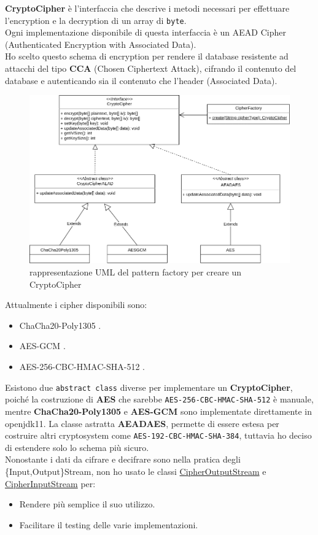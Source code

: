 \documentclass[a4paper,12pt]{report}
\begin{document}
\textbf{CryptoCipher} è l'interfaccia che descrive i metodi necessari per effettuare
l'encryption e la decryption di un array di \texttt{byte}.\\
Ogni implementazione disponibile di questa interfaccia è un
AEAD Cipher \cite{AEAD}
(Authenticated Encryption with Associated Data).\\
Ho scelto questo schema di encryption per rendere il database resistente ad 
attacchi del tipo \textbf{CCA} (Chosen Ciphertext Attack), cifrando il contenuto del
database e autenticando sia il contenuto che l'header (Associated Data).
\begin{figure}[h]
\centering{}
\includegraphics[width=\textwidth]{crypto-cipher}
\caption{rappresentazione UML del pattern factory per creare un CryptoCipher}
\end{figure}
Attualmente i cipher disponibili sono:
\begin{itemize}
  \item ChaCha20-Poly1305 \cite{c20}.
  \item AES-GCM \cite{aesgcm}.
  \item AES-256-CBC-HMAC-SHA-512 \cite{aes}.
\end{itemize}

Esistono due \texttt{abstract class} diverse per implementare un \textbf{CryptoCipher},
poiché la costruzione di \textbf{AES} che sarebbe \texttt{AES-256-CBC-HMAC-SHA-512} è manuale,
mentre \textbf{ChaCha20-Poly1305} e \textbf{AES-GCM} sono implementate direttamente in openjdk11.
La classe astratta \textbf{AEADAES}, permette di essere estesa per costruire altri
cryptosystem come \texttt{AES-192-CBC-HMAC-SHA-384}, tuttavia ho deciso di estendere
solo lo schema più sicuro.\\
Nonostante i dati da cifrare e decifrare sono nella pratica degli \{Input,Output\}Stream,
non ho usato le classi \href{https://docs.oracle.com/en/java/javase/11/docs/api/java.base/javax/crypto/CipherOutputStream.html}{CipherOutputStream}
e \href{https://docs.oracle.com/en/java/javase/11/docs/api/java.base/javax/crypto/CipherInputStream.html}{CipherInputStream}
per:
\begin{itemize}
  \item Rendere più semplice il suo utilizzo.
  \item Facilitare il testing delle varie implementazioni.
\end{itemize}
\end{document}
